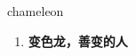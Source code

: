 
\begin{frame}
{\huge chameleon}
\begin{center}
\begin{enumerate}\Large
  \item \textbf{变色龙，善变的人}
\end{enumerate}
\end{center}
\end{frame}
